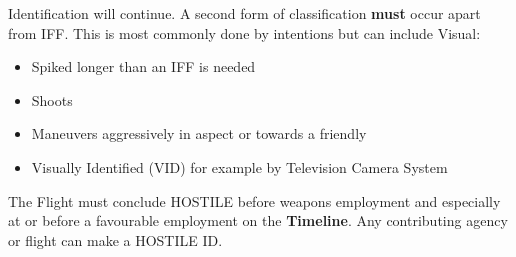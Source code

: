 Identification will continue. A second form of classification \textbf{must}
occur apart from IFF. This is most commonly done by intentions but can include
Visual:

\begin{itemize}
  \item Spiked longer than an IFF is needed
  \item Shoots
  \item Maneuvers aggressively in aspect or towards a friendly
  \item Visually Identified (VID) for example by Television Camera System
\end{itemize}

The Flight must conclude HOSTILE before weapons employment and especially at or
before a favourable employment on the \textbf{Timeline}. Any contributing
agency or flight can make a HOSTILE ID.

